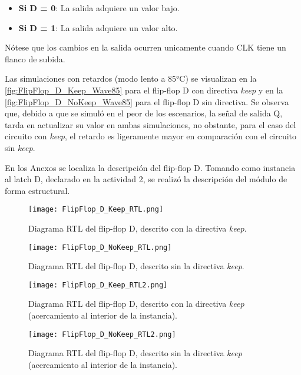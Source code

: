 \begin{itemize}
	\item \textbf{Si D = 0}: La salida adquiere un valor bajo.
	\item \textbf{Si D = 1}: La salida adquiere un valor alto.
\end{itemize}

Nótese que los cambios en la salida ocurren unicamente cuando CLK tiene un flanco de subida.

Las simulaciones con retardos (modo lento a 85°C) se visualizan en la \autoref{fig:FlipFlop_D_Keep_Wave85} para el flip-flop D con directiva \textit{keep} y en la \autoref{fig:FlipFlop_D_NoKeep_Wave85} para el flip-flop D sin directiva. Se observa que, debido a que se simuló en el peor de los escenarios, la señal de salida Q, tarda en actualizar su valor en ambas simulaciones, no obstante, para el caso del circuito con \textit{keep}, el retardo es ligeramente mayor en comparación con el circuito sin \textit{keep}.

En los Anexos se localiza la descripción del flip-flop D. Tomando como instancia al latch D, declarado en la actividad 2, se realizó la descripción del módulo de forma estructural.

\begin{figure}[ht]
	\centering
	\texttt{[image: FlipFlop\_D\_Keep\_RTL.png]}
	\caption{Diagrama RTL del flip-flop D, descrito con la directiva \textit{keep}. \label{fig:FlipFlop_D_Keep_RTL}}
\end{figure}

\begin{figure}[ht]
	\centering
	\texttt{[image: FlipFlop\_D\_NoKeep\_RTL.png]}
	\caption{Diagrama RTL del flip-flop D, descrito sin la directiva \textit{keep}. \label{fig:FlipFlop_D_NoKeep_RTL}}
\end{figure}

\begin{figure}[ht]
	\centering
	\texttt{[image: FlipFlop\_D\_Keep\_RTL2.png]}
	\caption{Diagrama RTL del flip-flop D, descrito con la directiva \textit{keep} (acercamiento al interior de la instancia). \label{fig:FlipFlop_D_Keep_RTL2}}
\end{figure}

\begin{figure}[ht]
	\centering
	\texttt{[image: FlipFlop\_D\_NoKeep\_RTL2.png]}
	\caption{Diagrama RTL del flip-flop D, descrito sin la directiva \textit{keep} (acercamiento al interior de la instancia). \label{fig:FlipFlop_D_NoKeep_RTL2}}
\end{figure}

